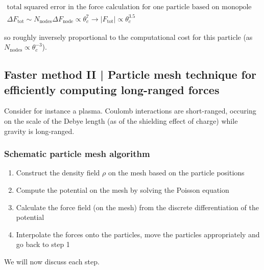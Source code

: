 \begin{equation}
    \begin{gathered}
        \text{total squared error in the force calculation for one particle based on monopole approximations: }\\
        \Delta F_{\text{tot}} \sim N_{\text{nodes}} \Delta F_{\text{node}} \propto \theta_c^7 \rightarrow |F_{\text{tot}}| \propto \theta_c^{3.5}
    \end{gathered}
\end{equation}

so \textcolor{blue1}{roughly inversely proportional to the computational cost for this particle} (as $N_{\text{nodes}} \propto \theta_c^{-3}$).


\subsection{Faster method II | Particle mesh technique for efficiently computing long-ranged forces}
Consider for instance a plasma. Coulomb interactions are short-ranged,
occuring on the scale of the Debye length (as of the shielding
effect of charge) while gravity is long-ranged.


\subsubsection{Schematic particle mesh algorithm}
\begin{enumerate}
    \item Construct the density field $\rho$ on the mesh based on the particle positions
    \item Compute the potential on the mesh by solving the Poisson equation
    \item Calculate the force field (on the mesh) from the discrete differentiation of the potential
    \item Interpolate the forces onto the particles, move the particles appropriately and go back to step 1
\end{enumerate}
We will now discuss each step.

